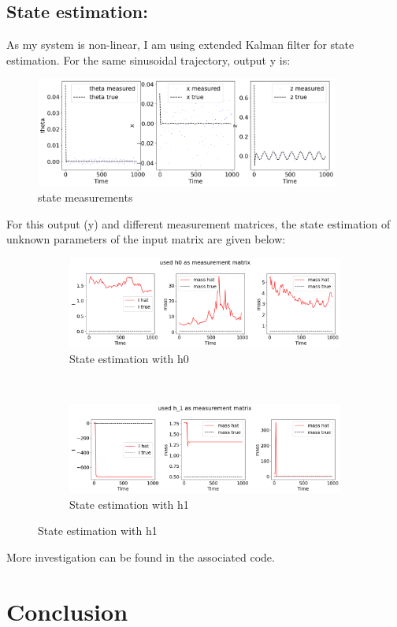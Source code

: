 \documentclass[12pt]{article}
\begin{document}
\subsection*{State estimation:}
As my system is non-linear, I am using extended Kalman filter for state estimation. For the same sinusoidal trajectory, output y is:
\begin{figure}[h!]
    \centering
    \includegraphics[width=10cm]{figures/phase_03_outputy1.png}
    \caption{state measurements}
    \label{fig:09}
\end{figure}
For this output (y) and different measurement matrices, the state estimation of unknown parameters of the input matrix are given below:

\begin{figure}[h!]
    \begin{subfigure}[t]{\textwidth}
        \centering
        \includegraphics[width=10cm]{figures/phase_03_param1.png}
        \caption{State estimation with h0}
        \label{fig:10}
    \end{subfigure}
    \\
    \begin{subfigure}[t]{\textwidth}
        \centering
        \includegraphics[width=10cm]{figures/phase_03_param2.png}
        \caption{State estimation with h1}
        \label{fig:11}
    \end{subfigure}
\end{figure}

More investigation can be found in the associated code.

\pagebreak
\section*{Conclusion}

\pagebreak


\end{document}
